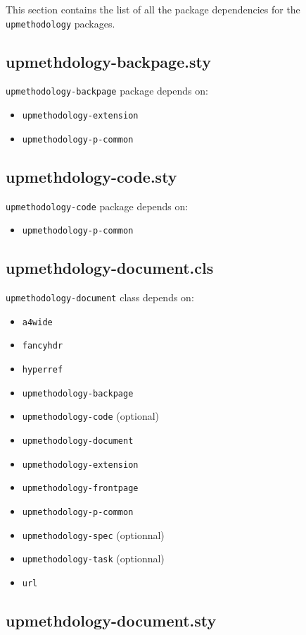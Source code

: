 \documentclass[book,taskpackage,specpackage,codepackage]{upmethodology-document}
\begin{document}
This section contains the list of all the package dependencies for the \texttt{upmethodology} packages.

\subsection{upmethdology-backpage.sty}

\texttt{upmethodology-backpage} package depends on:
\begin{itemize}
\item \texttt{upmethodology-extension}
\item \texttt{upmethodology-p-common}
\end{itemize}

\subsection{upmethdology-code.sty}

\texttt{upmethodology-code} package depends on:
\begin{itemize}
\item \texttt{upmethodology-p-common}
\end{itemize}

\subsection{upmethdology-document.cls}

\texttt{upmethodology-document} class depends on:
\begin{itemize}
\item \texttt{a4wide}
\item \texttt{fancyhdr}
\item \texttt{hyperref}
\item \texttt{upmethodology-backpage}
\item \texttt{upmethodology-code} (optional)
\item \texttt{upmethodology-document}
\item \texttt{upmethodology-extension}
\item \texttt{upmethodology-frontpage}
\item \texttt{upmethodology-p-common}
\item \texttt{upmethodology-spec} (optionnal)
\item \texttt{upmethodology-task} (optionnal)
\item \texttt{url}
\end{itemize}

\subsection{upmethdology-document.sty}
\end{document}

